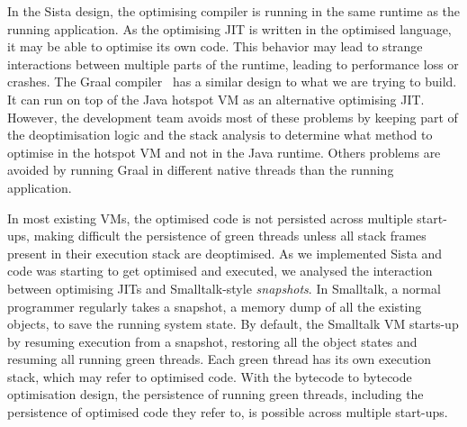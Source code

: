 \documentclass[a4paper,12pt,twoside]{../includes/ThesisStyle}
\begin{document}
In the Sista design, the optimising compiler is running in the same runtime as the running application. As the optimising JIT is written in the optimised language, it may be able to optimise its own code. This behavior may lead to strange interactions between multiple parts of the runtime, leading to performance loss or crashes. The Graal compiler~\cite{Dubo13c} has a similar design to what we are trying to build. It can run on top of the Java hotspot VM as an alternative optimising JIT. However, the development team avoids most of these problems by keeping part of the deoptimisation logic and the stack analysis to determine what method to optimise in the hotspot VM and not in the Java runtime. Others problems are avoided by running Graal in different native threads than the running application.

In most existing VMs, the optimised code is not persisted across multiple start-ups, making difficult the persistence of green threads unless all stack frames present in their execution stack are deoptimised. As we implemented Sista and code was starting to get optimised and executed, we analysed the interaction between optimising JITs and Smalltalk-style \emph{snapshots}. In Smalltalk, a normal programmer regularly takes a snapshot, a memory dump of all the existing objects, to save the running system state. By default, the Smalltalk VM starts-up by resuming execution from a snapshot, restoring all the object states and resuming all running green threads. Each green thread has its own execution stack, which may refer to optimised code. With the bytecode to bytecode optimisation design, the persistence of running green threads, including the persistence of optimised code they refer to, is possible across multiple start-ups.

\end{document}

